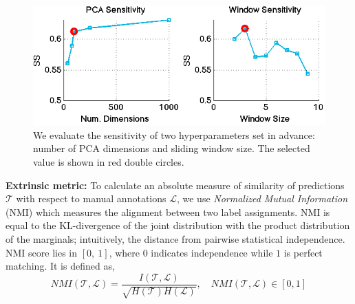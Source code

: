 \documentclass[0-main.tex]{subfiles}
\begin{document}
\begin{figure}[!b]
\vspace{-10pt}
\centering
    \includegraphics[width=0.95\linewidth]{figures/sensitivity}
    \caption{We evaluate the sensitivity of two hyperparameters set in advance: number of PCA dimensions and sliding window size. The selected value is shown in red double circles.\label{fig:sensitvity}}
\vspace{-10pt}
\end{figure}

\vspace{0.25em}
\noindent \textbf{Extrinsic metric:} To calculate an absolute measure of similarity of \tsc predictions $\mathcal{T}$ with respect to manual annotations $\mathcal{L}$, we use \textit{Normalized Mutual Information} (NMI) which measures the alignment between two label assignments. 
NMI is equal to the KL-divergence of the joint distribution with the product distribution of the marginals; intuitively, the distance from pairwise statistical independence.
NMI score lies in $[0,\ 1]$, where $0$ indicates independence while $1$  is perfect matching. It is defined as,
\[ NMI(\mathcal{T}, \mathcal{L}) = \frac{I(\mathcal{T}, \mathcal{L})}{\sqrt{H(\mathcal{T}) H(\mathcal{L})}}, \quad NMI(\mathcal{T}, \mathcal{L}) \in [0,1]
\]
\end{document}
